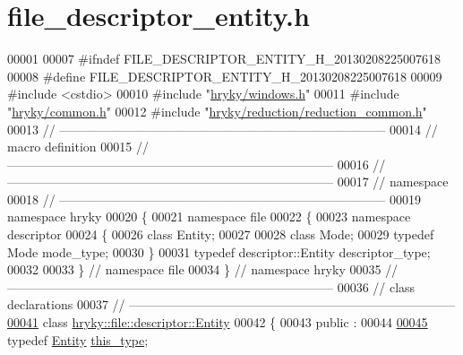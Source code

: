 \hypertarget{file__descriptor__entity_8h_source}{\section{file\-\_\-descriptor\-\_\-entity.\-h}
}

\begin{DoxyCode}
00001 
00007 \textcolor{preprocessor}{#ifndef FILE\_DESCRIPTOR\_ENTITY\_H\_20130208225007618}
00008 \textcolor{preprocessor}{}\textcolor{preprocessor}{#define FILE\_DESCRIPTOR\_ENTITY\_H\_20130208225007618}
00009 \textcolor{preprocessor}{}\textcolor{preprocessor}{#include <cstdio>}
00010 \textcolor{preprocessor}{#include "\hyperlink{windows_8h}{hryky/windows.h}"}
00011 \textcolor{preprocessor}{#include "\hyperlink{common_8h}{hryky/common.h}"}
00012 \textcolor{preprocessor}{#include "\hyperlink{reduction__common_8h}{hryky/reduction/reduction_common.h}"}
00013 \textcolor{comment}{//
      ------------------------------------------------------------------------------}
00014 \textcolor{comment}{// macro definition}
00015 \textcolor{comment}{//
      ------------------------------------------------------------------------------}
00016 \textcolor{comment}{//
      ------------------------------------------------------------------------------}
00017 \textcolor{comment}{// namespace}
00018 \textcolor{comment}{//
      ------------------------------------------------------------------------------}
00019 \textcolor{keyword}{namespace }hryky
00020 \{
00021 \textcolor{keyword}{namespace }file
00022 \{
00023 \textcolor{keyword}{namespace }descriptor
00024 \{
00026     \textcolor{keyword}{class }Entity;
00027 
00028     \textcolor{keyword}{class }Mode;
00029     \textcolor{keyword}{typedef} Mode mode\_type;
00030 \}
00031 \textcolor{keyword}{typedef} descriptor::Entity descriptor\_type;
00032 
00033 \} \textcolor{comment}{// namespace file}
00034 \} \textcolor{comment}{// namespace hryky}
00035 \textcolor{comment}{//
      ------------------------------------------------------------------------------}
00036 \textcolor{comment}{// class declarations}
00037 \textcolor{comment}{//
      ------------------------------------------------------------------------------}
\hypertarget{file__descriptor__entity_8h_source_l00041}{}\hyperlink{classhryky_1_1file_1_1descriptor_1_1_entity}{00041} \textcolor{comment}{}\textcolor{keyword}{class }\hyperlink{classhryky_1_1file_1_1descriptor_1_1_entity}{hryky::file::descriptor::Entity}
00042 \{
00043 \textcolor{keyword}{public} :
00044 
\hypertarget{file__descriptor__entity_8h_source_l00045}{}\hyperlink{classhryky_1_1file_1_1descriptor_1_1_entity_aeddd6b16ed286888bba1c419eee51d6c}{00045}     \textcolor{keyword}{typedef} \hyperlink{classhryky_1_1file_1_1descriptor_1_1_entity}{Entity} \hyperlink{classhryky_1_1file_1_1descriptor_1_1_entity_aeddd6b16ed286888bba1c419eee51d6c}{this_type};

\end{DoxyCode}
